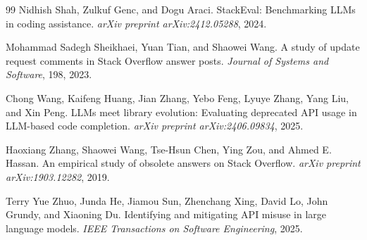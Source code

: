 \documentclass{article}
\begin{document}
\begin{thebibliography}{99}
Nidhish Shah, Zulkuf Genc, and Dogu Araci.
\newblock StackEval: Benchmarking LLMs in coding assistance.
\newblock \emph{arXiv preprint arXiv:2412.05288}, 2024.

Mohammad Sadegh Sheikhaei, Yuan Tian, and Shaowei Wang.
\newblock A study of update request comments in Stack Overflow answer posts.
\newblock \emph{Journal of Systems and Software}, 198, 2023.

Chong Wang, Kaifeng Huang, Jian Zhang, Yebo Feng, Lyuye Zhang, Yang Liu, and Xin Peng.
\newblock LLMs meet library evolution: Evaluating deprecated API usage in LLM-based code completion.
\newblock \emph{arXiv preprint arXiv:2406.09834}, 2025.

Haoxiang Zhang, Shaowei Wang, Tse-Hsun Chen, Ying Zou, and Ahmed E. Hassan.
\newblock An empirical study of obsolete answers on Stack Overflow.
\newblock \emph{arXiv preprint arXiv:1903.12282}, 2019.

Terry Yue Zhuo, Junda He, Jiamou Sun, Zhenchang Xing, David Lo, John Grundy, and Xiaoning Du.
\newblock Identifying and mitigating API misuse in large language models.
\newblock \emph{IEEE Transactions on Software Engineering}, 2025.

\end{thebibliography}
\end{document}
